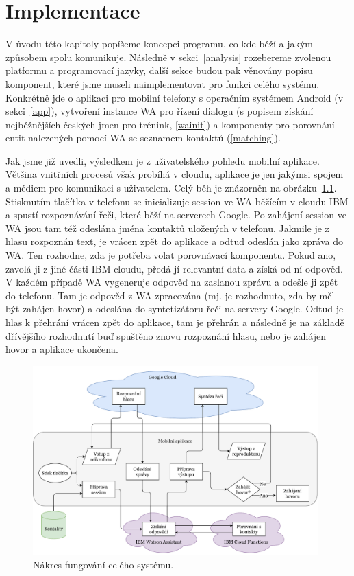 \chapter{Implementace}

V úvodu této kapitoly popíšeme koncepci programu, co kde
běží a jakým způsobem spolu komunikuje. Následně v sekci~\ref{analysis}
rozebereme zvolenou platformu a programovací jazyky,
další sekce budou pak věnovány popisu komponent, které jsme museli
naimplementovat pro funkci celého systému. Konkrétně jde o aplikaci pro
mobilní telefony s operačním systémem Android (v sekci~\ref{app}), vytvoření instance WA pro řízení
dialogu (s popisem získání nejběžnějších českých jmen pro trénink, \ref{wainit}) a komponenty
pro porovnání entit nalezených pomocí WA se seznamem kontaktů (\ref{matching}).

Jak jsme již uvedli, výsledkem je z uživatelského pohledu mobilní
aplikace. Většina vnitřních procesů však probíhá v cloudu, aplikace
je jen jakýmsi spojem a médiem pro komunikaci s uživatelem. Celý běh
je znázorněn na obrázku~\ref{img-flowchart}. Stisknutím tlačítka v
telefonu se
inicializuje session ve WA běžícím v cloudu IBM a spustí rozpoznávání řeči,
které běží na serverech Google. Po zahájení session ve WA jsou tam též
odeslána jména kontaktů uložených v telefonu. Jakmile je z hlasu rozpoznán
text, je vrácen zpět do aplikace a odtud odeslán jako zpráva do WA.
Ten rozhodne, zda je potřeba volat
porovnávací komponentu. Pokud ano, zavolá ji z jiné části IBM cloudu,
předá jí relevantní data a získá od ní odpověď. V každém případě
WA vygeneruje odpověď na zaslanou zprávu a odešle ji zpět do telefonu.
Tam je odpověď z WA zpracována (mj. je rozhodnuto, zda by měl být
zahájen hovor) a odeslána do syntetizátoru řeči na servery Google.
Odtud je hlas k přehrání vrácen zpět do aplikace, tam je přehrán
a následně je na základě dřívějšího rozhodnutí buď spuštěno znovu
rozpoznání hlasu, nebo je zahájen hovor a aplikace ukončena.


\begin{figure}[h]
    \centering
    \includegraphics[width=0.98\textwidth]{../img/app-flowchart.pdf}
    \caption{Nákres fungování celého systému.}
    \label{img-flowchart}
\end{figure}

